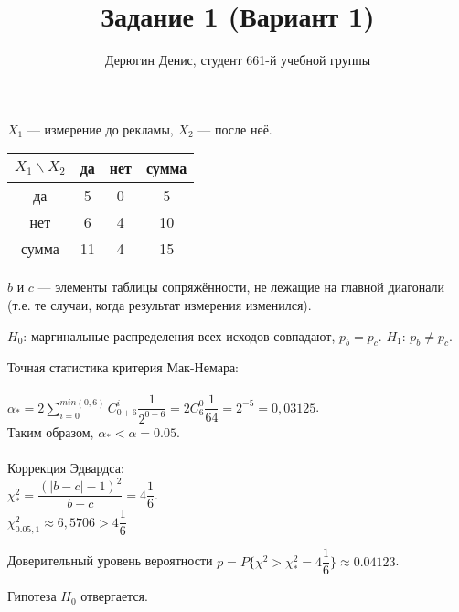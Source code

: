 \documentclass[20pt]{article}
\title{Задание 1 (Вариант 1)}
\author{
	Дерюгин Денис, студент 661-й учебной группы
}
\begin{document}
\large{
\maketitle
$X_1$ --- измерение до рекламы, $X_2$ --- после неё.


\begin{center}
    \begin{tabular}{ | c | c | c | c |}
        \hline
        $X_1 \backslash X_2$ & да & нет & сумма \\ \hline
        да & 5 & 0 & 5 \\ 
        нет & 6 & 4 & 10\\ \hline
        сумма & 11 & 4 & 15\\ 
        \hline
    \end{tabular}
\end{center}

$b$ и $c$ --- элементы таблицы сопряжённости, не лежащие на главной диагонали (т.е. те случаи, когда результат измерения изменился).

$H_0$: маргинальные распределения всех исходов совпадают, $p_b = p_c$.
$H_1$: $p_b \neq p_c$.



Точная статистика критерия Мак-Немара: \\ \\
$\alpha_* = 2 \sum_{i=0}^{min(0,6)}C_{0 + 6}^i \dfrac{1}{2^{0 + 6}} = 2 C^0_6 \dfrac{1}{64} = 2^{-5} = 0,03125$.\\

Таким образом, $\alpha_* < \alpha = 0.05$. \\ \\

Коррекция Эдвардса:\\ $\chi^2_* = \dfrac{(|b-c|-1)^2}{b+c} = 4\dfrac{1}{6}$.\\

$\chi^2_{0.05,1} \approx 6,5706 > 4\dfrac{1}{6}$

Доверительный уровень вероятности $p=P\{\chi^2 > \chi^2_* = 4\dfrac{1}{6}\} \approx 0.04123$.

Гипотеза $H_0$ отвергается.
}
\end{document}
